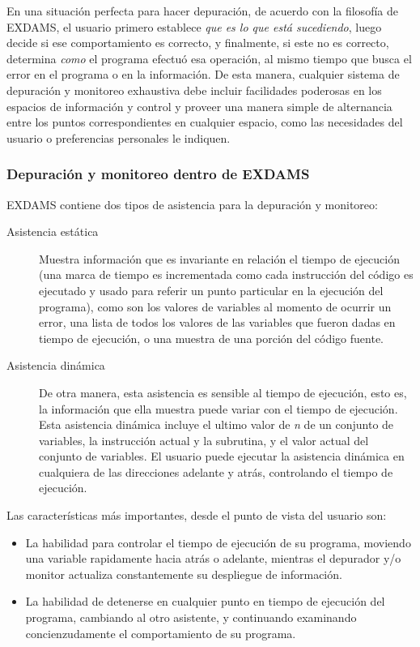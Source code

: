 \documentclass[12pt,a4paper]{report}
\begin{document}
En una situación perfecta para hacer depuración, de acuerdo con la filosofía de EXDAMS, el usuario primero establece \textit{que es lo que está sucediendo}, luego decide si ese comportamiento es correcto, y finalmente, si este no es correcto, determina \textit{como} el programa efectuó esa operación, al mismo tiempo que busca el error en el programa o en la información.  De esta manera, cualquier sistema de depuración y monitoreo exhaustiva debe incluir facilidades poderosas en los espacios de información y control y proveer una manera simple de alternancia entre los puntos correspondientes en cualquier espacio, como las necesidades del usuario o preferencias personales le indiquen.

			\subsubsection[Depuración y monitoreo]{Depuración y monitoreo dentro de EXDAMS}

EXDAMS contiene dos tipos de asistencia para la depuración y monitoreo:

\begin{description}
	\item[Asistencia estática] Muestra información que es invariante en relación el tiempo de ejecución (una marca de tiempo es incrementada como cada instrucción del código es ejecutado y usado para referir un punto particular en la ejecución del programa), como son los valores de variables al momento de ocurrir un error, una lista de todos los valores de las variables que fueron dadas en tiempo de ejecución, o una muestra de una porción del código fuente.

	\item[Asistencia dinámica] De otra manera, esta asistencia es sensible al tiempo de ejecución, esto es, la información que ella muestra puede variar con el tiempo de ejecución.  Esta asistencia dinámica incluye el ultimo valor de \textit{n} de un conjunto de variables, la instrucción actual y la subrutina, y el valor actual del conjunto de variables.  El usuario puede ejecutar la asistencia dinámica en cualquiera de las direcciones adelante y atrás, controlando el tiempo de ejecución.

\end{description}

Las características más importantes, desde el punto de vista del usuario son:

\begin{itemize}
	\item La habilidad para controlar el tiempo de ejecución de su programa, moviendo una variable rapidamente hacia atrás o adelante, mientras el depurador y/o monitor actualiza constantemente su despliegue de información.

	\item La habilidad de detenerse en cualquier punto en tiempo de ejecución del programa, cambiando al otro asistente, y continuando examinando concienzudamente el comportamiento de su programa.

\end{itemize}
\end{document}
